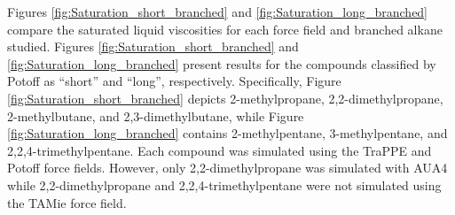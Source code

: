 \documentclass[preprint,review,12pt]{elsarticle}
\begin{document}
	Figures \ref{fig:Saturation_short_branched} and \ref{fig:Saturation_long_branched} compare the saturated liquid viscosities for each force field and branched alkane studied. Figures \ref{fig:Saturation_short_branched} and \ref{fig:Saturation_long_branched} present results for the compounds classified by Potoff as ``short'' and ``long'', respectively. Specifically, Figure \ref{fig:Saturation_short_branched} depicts 2-methylpropane, 2,2-dimethylpropane, 2-methylbutane, and 2,3-dimethylbutane, while Figure \ref{fig:Saturation_long_branched} contains 2-methylpentane, 3-methylpentane, and 2,2,4-trimethylpentane. Each compound was simulated using the TraPPE and Potoff force fields. However, only 2,2-dimethylpropane was simulated with AUA4 while 2,2-dimethylpropane and 2,2,4-trimethylpentane were not simulated using the TAMie force field.
	
	
\end{document}
